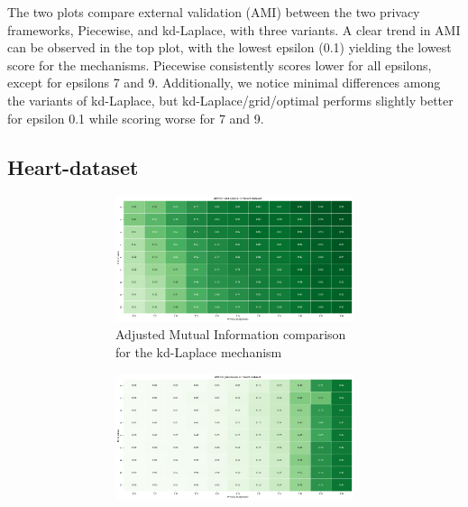 The two plots compare external validation (AMI) between the two privacy frameworks, Piecewise, and kd-Laplace, with three variants.
A clear trend in AMI can be observed in the top plot, with the lowest epsilon (0.1) yielding the lowest score for the mechanisms.
Piecewise consistently scores lower for all epsilons, except for epsilons 7 and 9.
Additionally, we notice minimal differences among the variants of kd-Laplace, but kd-Laplace/grid/optimal performs slightly better for epsilon 0.1 while scoring worse for 7 and 9.
\newpage
\subsection{Heart-dataset}
\begin{figure}[H]
    \centering
    \begin{subfigure}[b]{0.85\textwidth}
        \begin{subfigure}[c]{1\textwidth}
            \includegraphics[width=1\textwidth]{Results/kd-laplace/kd-Laplace/heart-dataset/ami.png}
            \caption{Adjusted Mutual Information comparison for the kd-Laplace mechanism}
            \label{fig:ami_heart-dataset_comparison_kdlaplace_2d}
        \end{subfigure}
        \vfill %
        \begin{subfigure}[c]{1\textwidth}
            \includegraphics[width=1\textwidth]{Results/kd-laplace/piecewise/heart-dataset/ami.png}

\end{subfigure}
\end{subfigure}
\end{figure}

